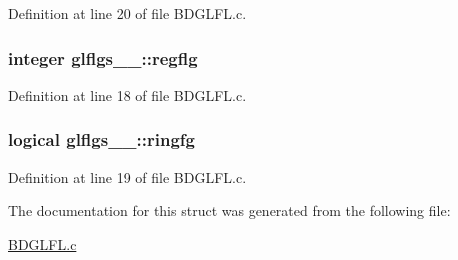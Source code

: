 Definition at line 20 of file B\+D\+G\+L\+F\+L.\+c.

\subsubsection[{\texorpdfstring{regflg}{regflg}}]{\setlength{\rightskip}{0pt plus 5cm}integer glflgs\+\_\+\_\+\+::regflg}\hypertarget{structglflgs__1___a8172c953ebbdb50f8fb446a44e8377e6}{}\label{structglflgs__1___a8172c953ebbdb50f8fb446a44e8377e6}


Definition at line 18 of file B\+D\+G\+L\+F\+L.\+c.

\subsubsection[{\texorpdfstring{ringfg}{ringfg}}]{\setlength{\rightskip}{0pt plus 5cm}logical glflgs\+\_\+\_\+\+::ringfg}\hypertarget{structglflgs__1___ad7c10f857b052aaef265cd68bc1ad905}{}\label{structglflgs__1___ad7c10f857b052aaef265cd68bc1ad905}


Definition at line 19 of file B\+D\+G\+L\+F\+L.\+c.



The documentation for this struct was generated from the following file\+:\begin{DoxyCompactItemize}
\item 
\hyperlink{BDGLFL_8c}{B\+D\+G\+L\+F\+L.\+c}\end{DoxyCompactItemize}
